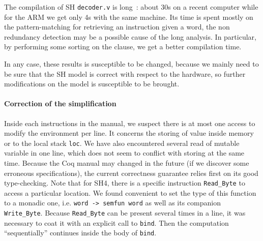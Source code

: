 \documentclass[a4paper, 11pt]{article}
\begin{document}
The compilation of SH {\tt decoder.v} is long~: about 30s on a recent computer while for the ARM we get only 4s with the same machine. Its time is spent mostly on the pattern-matching for retrieving an instruction given a word, the non redundancy detection may be a possible cause of the long analysis. In particular, by performing some sorting on the clause, we get a better compilation time.

\hspace{1ex}

In any case, these results is susceptible to be changed, because we mainly need to be sure that the SH model is correct with respect to the hardware, so further modifications on the model is susceptible to be brought.

\paragraph{Correction of the simplification}
Inside each instructions in the manual, we suspect there is at most one access to modify the environment per line. It concerns the storing of value inside memory or to the local stack \verb|loc|. We have also encountered several read of mutable variable in one line, which does not seem to conflict with storing at the same time. Because the Coq manual may changed in the future (if we discover some erroneous specifications), the current correctness guarantee relies first on its good type-checking.
Note that for SH4, there is a specific instruction \verb|Read_Byte| to access a particular location. We found convenient to set the type of this function to a monadic one, i.e. \verb|word -> semfun word| as well as its companion \verb|Write_Byte|. Because \verb|Read_Byte| can be present several times in a line, it was necessary to coat it with an explicit call to \verb|bind|. Then the computation ``sequentially'' continues inside the body of \verb|bind|.
\end{document}
